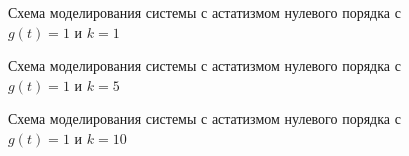 \documentclass[a4paper, 11pt]{article}
\begin{document}
\begin{figure}[h!]
\caption{Схема моделирования системы с астатизмом нулевого порядка с $g(t)=1$ и $k=1$}
\label{ris:image}
\end{figure}

\newpage
\begin{figure}[h!]
\caption{Схема моделирования системы с астатизмом нулевого порядка с $g(t)=1$ и $k=5$}
\label{ris:image}
\end{figure}

\begin{figure}[h!]
\caption{Схема моделирования системы с астатизмом нулевого порядка с $g(t)=1$ и $k=10$}
\label{ris:image}
\end{figure}
\end{document}
